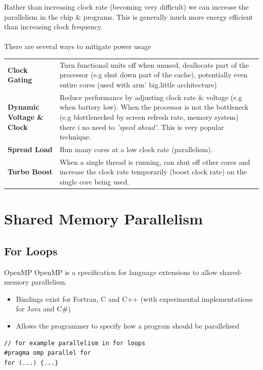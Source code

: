 Rather than increasing clock rate (becoming very difficult) we can increase the parallelism in the chip \& programs. This is generally much more energy efficient than increasing clock frequency.
\\
\\ There are several ways to mitigate power usage
\begin{center}
    \begin{tabular}{p{} p{}}
        \textbf{Clock Gating} & Turn functional units off when unused, deallocate part of the processor (e.g shut down part of the cache), potentially even entire cores (used with arm' big.little architecture) \\
        \textbf{Dynamic Voltage \& Clock} & Reduce performance by adjusting clock rate \& voltage (e.g when battery low). When the processor is not the bottleneck (e.g blottlenecked by screen refresh rate, memory system) there i no need to \textit{'speed ahead'}. This is very popular technique.  \\
        \textbf{Spread Load} & Run many cores at a low clock rate (parallelism). \\
        \textbf{Turbo Boost} & When a single thread is running, can shut off other cores and increase the clock rate temporarily (boost clock rate) on the single core being used. \\
    \end{tabular}
\end{center}

\section{Shared Memory Parallelism}
\subsection{For Loops}
\begin{definitionbox}{OpenMP}
    OpenMP is a specification for language extensions to allow shared-memory parallelism.
    \begin{itemize}
        \item Bindings exist for Fortran, C and C++ (with experimental implementations for Java and C\#)
        \item Allows the programmer to specify how a program should be parallelised
    \end{itemize}
    \begin{verbatim}
// for example parallelism in for loops
#pragma omp parallel for
for (...) {...}
    \end{verbatim}
\end{definitionbox}

